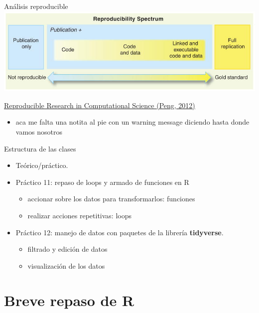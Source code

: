 \documentclass[
  ignorenonframetext,
]{beamer}
\providecommand{\tightlist}{%
  \setlength{\itemsep}{0pt}\setlength{\parskip}{0pt}}
\begin{document}
\begin{frame}{Análisis reproducible}
\protect\hypertarget{anuxe1lisis-reproducible}{}
\includegraphics{../../imgs/gradiente_reproducibilidad.png}

\href{https://www.ncbi.nlm.nih.gov/pmc/articles/PMC3383002/}{Reproducible
Research in Computational Science (Peng, 2012)}

\begin{itemize}
\tightlist
\item
  aca me falta una notita al pie con un warning message diciendo hasta
  donde vamos nosotros
\end{itemize}
\end{frame}

\begin{frame}{Estructura de las clases}
\protect\hypertarget{estructura-de-las-clases}{}
\begin{itemize}
\tightlist
\item
  Teórico/práctico.
\item
  Práctico 11: repaso de loops y armado de funciones en R

  \begin{itemize}
  \tightlist
  \item
    accionar sobre los datos para transformarlos: funciones
  \item
    realizar acciones repetitivas: loops
  \end{itemize}
\item
  Práctico 12: manejo de datos con paquetes de la librería
  \textbf{tidyverse}.

  \begin{itemize}
  \tightlist
  \item
    filtrado y edición de datos
  \item
    visualización de los datos
  \end{itemize}
\end{itemize}
\end{frame}

\hypertarget{breve-repaso-de-r}{%
\section{Breve repaso de R}\label{breve-repaso-de-r}}
\end{document}
